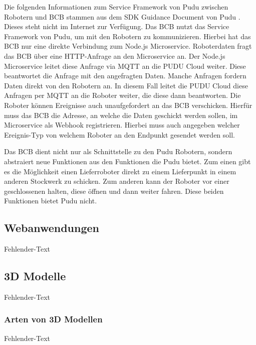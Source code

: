Die folgenden Informationen zum Service Framework von Pudu zwischen Robotern und \ac{BCB} stammen aus dem SDK Guidance Document von Pudu \cite{PuduSDK}. Dieses steht nicht im Internet zur Verfügung. Das \ac{BCB} nutzt das Service Framework von Pudu, um mit den Robotern zu kommunizieren. Hierbei hat das \ac{BCB} nur eine direkte Verbindung zum Node.js Microservice. Roboterdaten fragt das \ac{BCB} über eine \gls{HTTP}-Anfrage an den Microservice an. Der Node.js Microservice leitet diese Anfrage via \gls{MQTT} an die PUDU Cloud weiter. Diese beantwortet die Anfrage mit den angefragten Daten. Manche Anfragen fordern Daten direkt von den Robotern an. In diesem Fall leitet die PUDU Cloud diese Anfragen per \gls{MQTT} an die Roboter weiter, die diese dann beantworten. Die Roboter können Ereignisse auch unaufgefordert an das \ac{BCB} verschicken. Hierfür muss das \ac{BCB} die Adresse, an welche die Daten geschickt werden sollen, im Microservice als \gls{Webhook} registrieren. Hierbei muss auch angegeben welcher Ereignis-Typ von welchem Roboter an den Endpunkt gesendet werden soll.

Das \ac{BCB} dient nicht nur als Schnittstelle zu den Pudu Robotern, sondern abstraiert neue Funktionen aus den Funktionen die Pudu bietet. Zum einen gibt es die Möglichkeit einen Lieferroboter direkt zu einem Lieferpunkt in einem anderen Stockwerk zu schicken. Zum anderen kann der Roboter vor einer geschlossenen halten, diese öffnen und dann weiter fahren. Diese beiden Funktionen bietet Pudu nicht.

\newpage
\subsection{Webanwendungen}
Fehlender-Text


\newpage
\subsection{3D Modelle}
Fehlender-Text

\subsubsection{Arten von 3D Modellen}
Fehlender-Text

